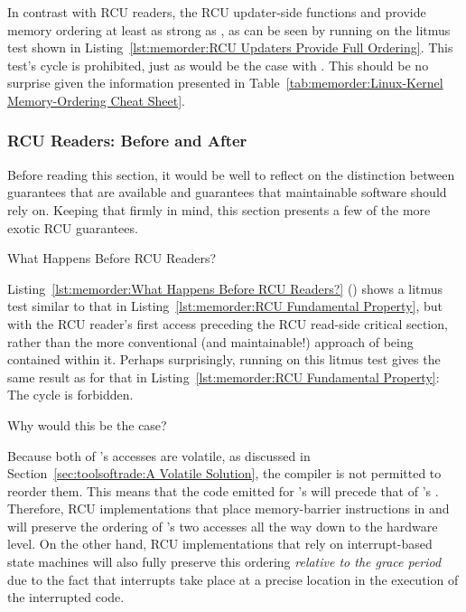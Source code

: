 In contrast with RCU readers, the RCU updater-side functions
 and 
provide memory ordering at least as strong as ,
as can be seen by running  on the litmus test shown in
Listing~\ref{lst:memorder:RCU Updaters Provide Full Ordering}.
This test's cycle is prohibited, just as would be the case with
.
This should be no surprise given the information presented in
Table~\ref{tab:memorder:Linux-Kernel Memory-Ordering Cheat Sheet}.

\subsubsection{RCU Readers: Before and After}
\label{sec:memorder:RCU Readers: Before and After}

Before reading this section, it would be well to reflect on the distinction
between guarantees that are available and guarantees that maintainable
software should rely on.
Keeping that firmly in mind, this section presents a few of the
more exotic RCU guarantees.

\begin{listing}[tb]

\caption{What Happens Before RCU Readers?}
\label{lst:memorder:What Happens Before RCU Readers?}
\end{listing}

Listing~\ref{lst:memorder:What Happens Before RCU Readers?}
()
shows a litmus test similar to that in
Listing~\ref{lst:memorder:RCU Fundamental Property},
but with the RCU reader's first access preceding the RCU read-side critical
section, rather than the more conventional (and maintainable!) approach of
being contained within it.
Perhaps surprisingly, running  on this litmus test gives the
same result as for that in
Listing~\ref{lst:memorder:RCU Fundamental Property}:
The cycle is forbidden.

Why would this be the case?

Because both of 's accesses are volatile,
as discussed in
Section~\ref{sec:toolsoftrade:A Volatile Solution},
the compiler is not permitted to reorder them.
This means that the code emitted for 's  will
precede that of 's .
Therefore, RCU implementations that place memory-barrier instructions in
 and  will preserve the ordering
of 's two accesses all the way down to the hardware level.
On the other hand, RCU implementations that rely on interrupt-based
state machines will also fully preserve this ordering
\emph{relative to the grace period} due to the fact that interrupts take
place at a precise location in the execution of the interrupted code.

